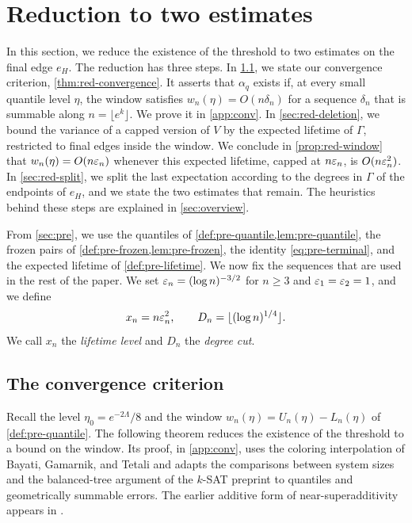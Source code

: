 \chapter{Reduction to two estimates}\label{sec:red}

In this section, we reduce the existence of the threshold to two estimates on the final edge $e_H$. The reduction has three steps. In \cref{sec:red-convergence}, we state our convergence criterion, \cref{thm:red-convergence}. It asserts that $\alpha_q$ exists if, at every small quantile level $\eta$, the window satisfies $w_n(\eta) = O(n \delta_n)$ for a sequence $\delta_n$ that is summable along $n = \lfloor e^k \rfloor$. We prove it in \cref{app:conv}. In \cref{sec:red-deletion}, we bound the variance of a capped version of $V$ by the expected lifetime of $\Gamma$, restricted to final edges inside the window. We conclude in \cref{prop:red-window} that $w_n(\eta) = O(n \varepsilon_n)$ whenever this expected lifetime, capped at $n \varepsilon_n$, is $O(n \varepsilon_n^2)$. In \cref{sec:red-split}, we split the last expectation according to the degrees in $\Gamma$ of the endpoints of $e_H$, and we state the two estimates that remain. The heuristics behind these steps are explained in \cref{sec:overview}.

From \cref{sec:pre}, we use the quantiles of \cref{def:pre-quantile,lem:pre-quantile}, the frozen pairs of \cref{def:pre-frozen,lem:pre-frozen}, the identity \eqref{eq:pre-terminal}, and the expected lifetime of \cref{def:pre-lifetime}. We now fix the sequences that are used in the rest of the paper. We set $\varepsilon_n = (\log n)^{-3/2}$ for $n \ge 3$ and $\varepsilon_1 = \varepsilon_2 = 1$, and we define
\begin{equation}\label{eq:red-parameters}
x_n = n \varepsilon_n^2, \qquad D_n = \lfloor (\log n)^{1/4} \rfloor.
\end{equation}
We call $x_n$ the \emph{lifetime level} and $D_n$ the \emph{degree cut}.

\section{The convergence criterion}\label{sec:red-convergence}

Recall the level $\eta_0 = e^{-2 \Lambda}/8$ and the window $w_n(\eta) = U_n(\eta) - L_n(\eta)$ of \cref{def:pre-quantile}. The following theorem reduces the existence of the threshold to a bound on the window. Its proof, in \cref{app:conv}, uses the coloring interpolation of Bayati, Gamarnik, and Tetali \cite[Theorem~5 and Proposition~2]{bayati2013combinatorial} and adapts the comparisons between system sizes and the balanced-tree argument of the $k$-SAT preprint \cite[Section~5]{openai2026limiting} to quantiles and geometrically summable errors. The earlier additive form of near-superadditivity appears in \cite[arXiv:1006.3786v1, Section~4.3, Lemma~8 and Remark~3]{abbe2014concentration}.


